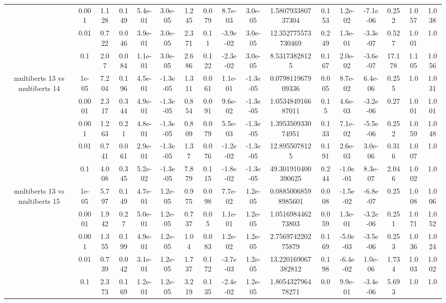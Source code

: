 \begin{tabular}{|c|c|c|c|c|c|c|c|c|c|c|c|c|c|c|c|c|}
 & 0.001 & 1.128 & 0.149 & 5.4e-01 & 3.0e-05 & 1.245 & 0.079 & 8.7e-03 & 3.0e-05 & 1.580793380737304 & 0.153 & 1.2e-02 & -7.1e-06 & 0.252 & 1.057 & 1.038 \\
 & 0.01 & 0.722 & 0.046 & 3.9e-01 & 3.0e-05 & 2.371 & 0.11 & -3.9e-02 & 3.0e-05 & 12.352775573730469 & 0.249 & 1.3e-01 & -3.3e-07 & 0.527 & 1.001 & 1.0 \\
 & 0.1 & 2.07 & 0.084 & 1.1e-01 & 3.0e-05 & 2.686 & 0.122 & -2.3e-02 & 3.0e-05 & 8.53173828125 & 0.167 & 2.0e-02 & -3.6e-07 & 17.178 & 1.105 & 1.056 \\
\hline
\multirow{5}{*}{multiberts 13 vs multiberts 14} & 1e-05 & 7.204 & 0.196 & 4.5e-01 & -1.3e-05 & 1.311 & 0.061 & 1.1e-01 & -1.3e-05 & 0.079811967909336 & 0.005 & 8.7e-02 & 6.4e-06 & 0.255 & 1.0 & 1.031 \\
 & 0.0001 & 2.317 & 0.344 & 4.9e-01 & -1.3e-05 & 0.854 & 0.091 & 9.6e-02 & -1.3e-05 & 1.053484916687011 & 0.15 & 4.6e-03 & -3.2e-06 & 0.27 & 1.001 & 1.001 \\
 & 0.001 & 1.263 & 0.21 & 4.8e-01 & -1.3e-05 & 0.809 & 0.079 & 5.5e-03 & -1.3e-05 & 1.395350933074951 & 0.133 & 7.1e-02 & -5.5e-06 & 0.252 & 1.059 & 1.048 \\
 & 0.01 & 0.741 & 0.061 & 2.9e-01 & -1.3e-05 & 1.37 & 0.076 & -1.2e-02 & -1.3e-05 & 12.8955078125 & 0.191 & 2.6e-03 & 3.0e-06 & 0.316 & 1.007 & 1.0 \\
 & 0.1 & 4.008 & 0.345 & 5.2e-02 & -1.3e-05 & 7.879 & 0.115 & -1.8e-02 & -1.3e-05 & 49.301910400390625 & 0.244 & -1.0e-01 & 8.3e-07 & 2.046 & 1.002 & 1.0 \\
\hline
\multirow{5}{*}{multiberts 13 vs multiberts 15} & 1e-05 & 5.797 & 0.149 & 4.7e-01 & 1.2e-05 & 0.975 & 0.098 & 7.7e-02 & 1.2e-05 & 0.08850068598985601 & 0.008 & -1.5e-02 & -6.8e-07 & 0.25 & 1.008 & 1.006 \\
 & 0.0001 & 1.942 & 0.27 & 5.0e-01 & 1.2e-05 & 0.737 & 0.05 & 1.1e-01 & 1.2e-05 & 1.051698446273803 & 0.059 & 1.3e-01 & -3.2e-06 & 0.251 & 1.071 & 1.052 \\
 & 0.001 & 1.355 & 0.199 & 4.9e-01 & 1.2e-05 & 1.04 & 0.083 & 1.2e-02 & 1.2e-05 & 2.756974220275879 & 0.169 & -5.0e-03 & -3.5e-06 & 0.253 & 1.036 & 1.024 \\
 & 0.01 & 0.739 & 0.042 & 3.1e-01 & 1.2e-05 & 1.737 & 0.172 & -3.7e-03 & 1.2e-05 & 13.220169067382812 & 0.198 & -6.4e-02 & 1.0e-06 & 1.734 & 1.003 & 1.002 \\
 & 0.1 & 2.373 & 0.169 & 1.2e-01 & 1.2e-05 & 3.219 & 0.135 & -2.4e-02 & 1.2e-05 & 1.805432796478271 & 0.0 & 9.9e-01 & -3.4e-06 & 5.693 & 1.0 & 1.0 \\

\end{tabular}
